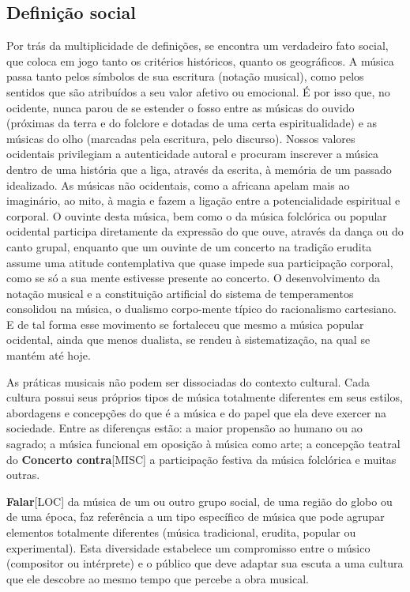 \documentclass[a4paper,12pt]{article}
\begin{document}
\subsection*{Definição social}
Por trás da multiplicidade de definições, se encontra um verdadeiro fato social, que coloca em jogo tanto os critérios históricos, quanto os geográficos. A música passa tanto pelos símbolos de sua escritura (notação musical), como pelos sentidos que são atribuídos a seu valor afetivo ou emocional. É por isso que, no ocidente, nunca parou de se estender o fosso entre as músicas do ouvido (próximas da terra e do folclore e dotadas de uma certa espiritualidade) e as músicas do olho (marcadas pela escritura, pelo discurso). Nossos valores ocidentais privilegiam a autenticidade autoral e procuram inscrever a música dentro de uma história que a liga, através da escrita, à memória de um passado idealizado. As músicas não ocidentais, como a africana apelam mais ao imaginário, ao mito, à magia e fazem a ligação entre a potencialidade espiritual e corporal. O ouvinte desta música, bem como o da música folclórica ou popular ocidental participa diretamente da expressão do que ouve, através da dança ou do canto grupal, enquanto que um ouvinte de um concerto na tradição erudita assume uma atitude contemplativa que quase impede sua participação corporal, como se só a sua mente estivesse presente ao concerto. O desenvolvimento da notação musical e a constituição artificial do sistema de temperamentos consolidou na música, o dualismo corpo-mente típico do racionalismo cartesiano. E de tal forma esse movimento se fortaleceu que mesmo a música popular ocidental, ainda que menos dualista, se rendeu à sistematização, na qual se mantém até hoje.

As práticas musicais não podem ser dissociadas do contexto cultural. Cada cultura possui seus próprios tipos de música totalmente diferentes em seus estilos, abordagens e concepções do que é a música e do papel que ela deve exercer na sociedade. Entre as diferenças estão: a maior propensão ao humano ou ao sagrado; a música funcional em oposição à música como arte; a concepção teatral do \textbf{Concerto contra}\textsc{[MISC]} a participação festiva da música folclórica e muitas outras.

\textbf{Falar}\textsc{[LOC]} da música de um ou outro grupo social, de uma região do globo ou de uma época, faz referência a um tipo específico de música que pode agrupar elementos totalmente diferentes (música tradicional, erudita, popular ou experimental). Esta diversidade estabelece um compromisso entre o músico (compositor ou intérprete) e o público que deve adaptar sua escuta a uma cultura que ele descobre ao mesmo tempo que percebe a obra musical.
\end{document}
